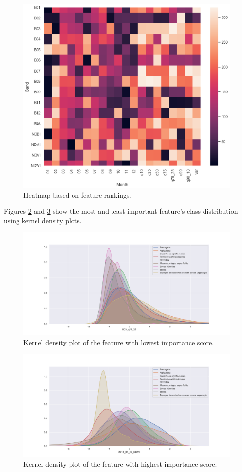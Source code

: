 \documentclass[12pt, english, openany]{book}
\begin{document}
\begin{figure}[H]
  \centering
  \includegraphics[width=.8\linewidth]{band_month_rank_heatmap.png}
  \caption{Heatmap based on feature rankings.}
  \label{fig:band_month_rank_heatmap}
\end{figure}

Figures \ref{fig:bottom_feature_dist} and \ref{fig:top_feature_dist} show the most and
least important feature's class distribution using kernel density plots.

\begin{figure}[H]
  \centering
  \includegraphics[width=1\linewidth]{bottom_feature_dist.png}
  \caption{Kernel density plot of the feature with lowest importance score.}
  \label{fig:bottom_feature_dist}
\end{figure}

\begin{figure}[H]
  \centering
  \includegraphics[width=1\linewidth]{top_feature_dist.png}
  \caption{Kernel density plot of the feature with highest importance score.}
  \label{fig:top_feature_dist}
\end{figure}
\end{document}
